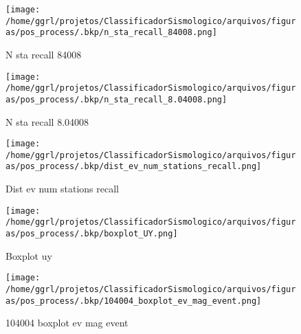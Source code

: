                     \begin{figure}[H]
                        \centering
                        \texttt{[image: /home/ggrl/projetos/ClassificadorSismologico/arquivos/figuras/pos\_process/.bkp/n\_sta\_recall\_84008.png]}
                        \caption{N sta recall 84008}
                        \label{fig:n_sta_recall_84008}
                    \end{figure}
                

                    \begin{figure}[H]
                        \centering
                        \texttt{[image: /home/ggrl/projetos/ClassificadorSismologico/arquivos/figuras/pos\_process/.bkp/n\_sta\_recall\_8.04008.png]}
                        \caption{N sta recall 8.04008}
                        \label{fig:n_sta_recall_8.04008}
                    \end{figure}
                

                    \begin{figure}[H]
                        \centering
                        \texttt{[image: /home/ggrl/projetos/ClassificadorSismologico/arquivos/figuras/pos\_process/.bkp/dist\_ev\_num\_stations\_recall.png]}
                        \caption{Dist ev num stations recall}
                        \label{fig:dist_ev_num_stations_recall}
                    \end{figure}
                

                    \begin{figure}[H]
                        \centering
                        \texttt{[image: /home/ggrl/projetos/ClassificadorSismologico/arquivos/figuras/pos\_process/.bkp/boxplot\_UY.png]}
                        \caption{Boxplot uy}
                        \label{fig:boxplot_UY}
                    \end{figure}
                

                    \begin{figure}[H]
                        \centering
                        \texttt{[image: /home/ggrl/projetos/ClassificadorSismologico/arquivos/figuras/pos\_process/.bkp/104004\_boxplot\_ev\_mag\_event.png]}
                        \caption{104004 boxplot ev mag event}
                        \label{fig:104004_boxplot_ev_mag_event}
                    \end{figure}
                

